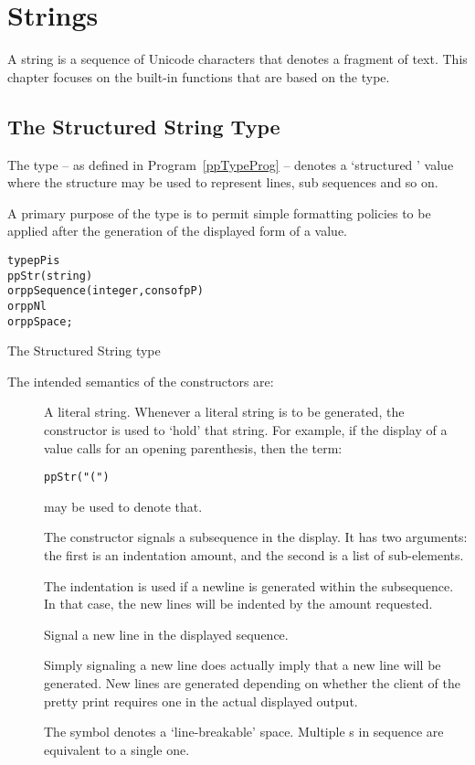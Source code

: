 \chapter{Strings}
\label{strings}
A string is a sequence of Unicode characters that denotes a fragment of text. This chapter focuses on the built-in functions that are based on the  type.

\section{The Structured String  Type}
\label{ppType}
The  type -- as defined in Program~\vref{ppTypeProg} -- denotes a `structured ' value where the structure may be used to represent lines, sub sequences and so on.
\begin{aside}
A primary purpose of the  type is to permit simple formatting policies to be applied after the generation of the displayed form of a value.
\end{aside} 

\begin{program}
\begin{alltt}
type pP is 
     ppStr(string)
  or ppSequence(integer,cons of pP)
  or ppNl
  or ppSpace;
\end{alltt}
\caption{The Structured String  type}\label{ppTypeProg}
\end{program}

The intended semantics of the constructors are:
\begin{description}
\item[] A literal string. Whenever a literal string is to be generated, the  constructor is used to `hold' that string. For example, if the display of a value calls for an opening parenthesis, then the term:
\begin{alltt}
ppStr("(")
\end{alltt}
may be used to denote that.
\item[]
The  constructor signals a subsequence in the display. It has two arguments: the first is an indentation amount, and the second is a  list of sub-elements.

The indentation is used if a newline is generated within the subsequence. In that case, the new lines will be indented by the amount requested.
\item[]
Signal a new line in the displayed sequence. 
\begin{aside}
Simply signaling a new line does actually imply that a new line will be generated. New lines are generated depending on whether the client of the pretty print requires one in the actual displayed output.
\end{aside}
\item[]
The  symbol denotes a `line-breakable' space. Multiple s in sequence are equivalent to a single one.
\end{description}

